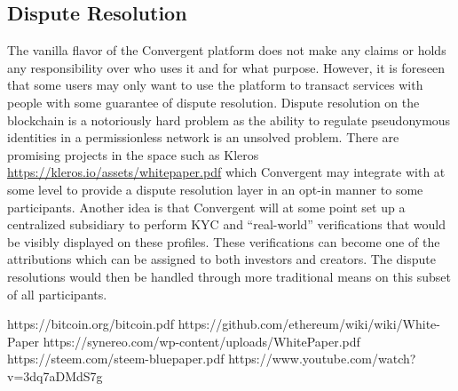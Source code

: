 \documentclass[a4paper, 10pt]{article}
\begin{document}
\subsection{Dispute Resolution}

The vanilla flavor of the Convergent platform does not make any claims or holds any responsibility over who uses it and for what purpose. However, it is foreseen that some users may only want to use the platform to transact services with people with some guarantee of dispute resolution. Dispute resolution on the blockchain is a notoriously hard problem as the ability to regulate pseudonymous identities in a permissionless network is an unsolved problem. There are promising projects in the space such as Kleros \url{https://kleros.io/assets/whitepaper.pdf} which Convergent may integrate with at some level to provide a dispute resolution layer in an opt-in manner to some participants. Another idea is that Convergent will at some point set up a centralized subsidiary to perform KYC and “real-world” verifications that would be visibly displayed on these profiles. These verifications can become one of the attributions which can be assigned to both investors and creators. The dispute resolutions would then be handled through more traditional means on this subset of all participants.

\begin{thebibliography}{1}

 https://bitcoin.org/bitcoin.pdf
 https://github.com/ethereum/wiki/wiki/White-Paper
 https://synereo.com/wp-content/uploads/WhitePaper.pdf
 https://steem.com/steem-bluepaper.pdf
 https://www.youtube.com/watch?v=3dq7aDMdS7g

\end{thebibliography}
\end{document}
